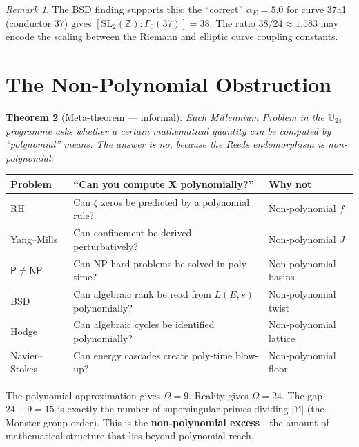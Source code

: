 \documentclass[11pt,a4paper]{article}
\theoremstyle{plain}
\newtheorem{theorem}{Theorem}[section]
\theoremstyle{definition}
\theoremstyle{remark}
\newtheorem{remark}[theorem]{Remark}
\begin{document}
\begin{remark}
The BSD finding supports this: the ``correct'' $\alpha_E = 5.0$ for curve 37a1 (conductor 37) gives $[\text{SL}_2(\mathbb{Z}) : \Gamma_0(37)] = 38$. The ratio $38/24 \approx 1.583$ may encode the scaling between the Riemann and elliptic curve coupling constants.
\end{remark}

\section{The Non-Polynomial Obstruction}

\begin{theorem}[Meta-theorem --- informal]
Each Millennium Problem in the $\mathbb{U}_{24}$ programme asks whether a certain mathematical quantity can be computed by ``polynomial'' means. The answer is no, because the Reeds endomorphism is non-polynomial:
\end{theorem}

\begin{center}\small
\begin{tabular}{lll}
\toprule
Problem & ``Can you compute X polynomially?'' & Why not \\
\midrule
RH & Can $\zeta$ zeros be predicted by a polynomial rule? & Non-polynomial $f$ \\
Yang--Mills & Can confinement be derived perturbatively? & Non-polynomial $J$ \\
$\mathsf{P} \neq \mathsf{NP}$ & Can NP-hard problems be solved in poly time? & Non-polynomial basins \\
BSD & Can algebraic rank be read from $L(E,s)$ polynomially? & Non-polynomial twist \\
Hodge & Can algebraic cycles be identified polynomially? & Non-polynomial lattice \\
Navier--Stokes & Can energy cascades create poly-time blow-up? & Non-polynomial floor \\
\bottomrule
\end{tabular}
\end{center}

The polynomial approximation gives $\Omega = 9$. Reality gives $\Omega = 24$. The gap $24 - 9 = 15$ is exactly the number of supersingular primes dividing $|\mathbb{M}|$ (the Monster group order). This is the \textbf{non-polynomial excess}---the amount of mathematical structure that lies beyond polynomial reach.
\end{document}
